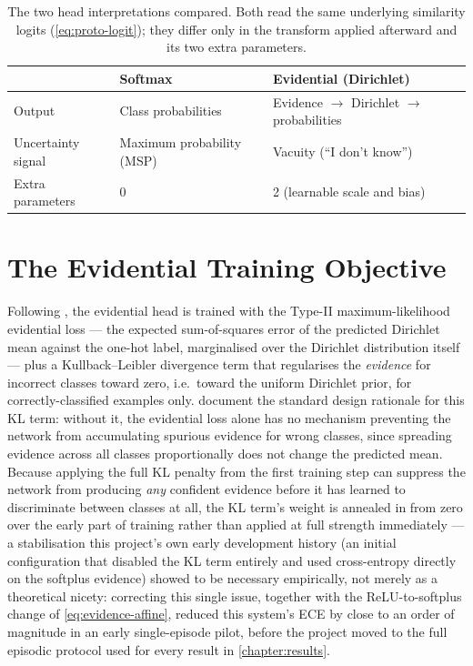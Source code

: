 \documentclass{iutbscthesis}
\begin{document}
\begin{table}[H]
    \centering
    \small
    \begin{tabular}{lll}
        \toprule
        & Softmax & Evidential (Dirichlet) \\
        \midrule
        Output & Class probabilities & Evidence $\to$ Dirichlet $\to$ probabilities \\
        Uncertainty signal & Maximum probability (MSP) & Vacuity (``I don't know'') \\
        Extra parameters & 0 & 2 (learnable scale and bias) \\
        \bottomrule
    \end{tabular}
    \caption{The two head interpretations compared. Both read the same underlying similarity logits (\autoref{eq:proto-logit}); they differ only in the transform applied afterward and its two extra parameters.}
    \label{tab:head-comparison}
\end{table}

\section{The Evidential Training Objective}
\label{sec:method-evidential-loss}

Following \textcite{sensoy2018edl}, the evidential head is trained with the Type-II maximum-likelihood evidential loss — the expected sum-of-squares error of the predicted Dirichlet mean against the one-hot label, marginalised over the Dirichlet distribution itself — plus a Kullback--Leibler divergence term that regularises the \emph{evidence} for incorrect classes toward zero, i.e.\ toward the uniform Dirichlet prior, for correctly-classified examples only. \textcite{gao2024edlsurvey} document the standard design rationale for this KL term: without it, the evidential loss alone has no mechanism preventing the network from accumulating spurious evidence for wrong classes, since spreading evidence across all classes proportionally does not change the predicted mean. Because applying the full KL penalty from the first training step can suppress the network from producing \emph{any} confident evidence before it has learned to discriminate between classes at all, the KL term's weight is annealed in from zero over the early part of training rather than applied at full strength immediately — a stabilisation this project's own early development history (an initial configuration that disabled the KL term entirely and used cross-entropy directly on the softplus evidence) showed to be necessary empirically, not merely as a theoretical nicety: correcting this single issue, together with the ReLU-to-softplus change of \autoref{eq:evidence-affine}, reduced this system's ECE by close to an order of magnitude in an early single-episode pilot, before the project moved to the full episodic protocol used for every result in \autoref{chapter:results}.
\end{document}
